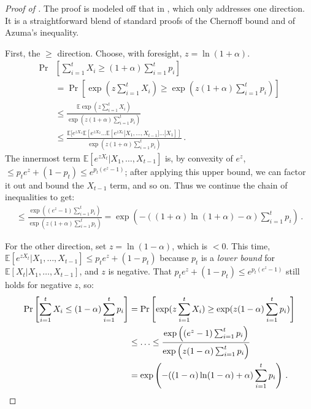 \documentclass[10pt,a4paper]{article}
\theoremstyle{definition}
\theoremstyle{remark}
\newcommand{\EE}{\mathbb{E}}
\begin{document}
\begin{itemize}
\begin{itemize}
\begin{proof}[Proof of ]
  The proof is modeled off that in \cite{Stoeckl23}, which only addresses
  one direction. It is a straightforward blend of standard proofs of the Chernoff bound and of Azuma's inequality.

  First, the $\ge$ direction. Choose, with foresight, $z = \ln(1 + \alpha)$.
  \begin{align*}
    \Pr&\left[ \sum_{i=1}^{t} X_i \ge (1 + \alpha) \sum_{i =1}^{t} p_i \right] \\
      &= \Pr\left[ \exp( z \sum_{i=1}^{t} X_i) \ge \exp(z (1 + \alpha) \sum_{i =1}^{t} p_i) \right] \\
      &\le \frac{\EE \exp( z \sum_{i=1}^{t} X_i)}{\exp(z (1 + \alpha) \sum_{i =1}^{t} p_i)} \\
      &\le \frac{\EE[e^{z X_1} \EE[e^{z X_2} \ldots \EE[e^{z X_t} | X_1,\ldots,X_{t-1}] \ldots | X_1] ]}{\exp(z (1 + \alpha) \sum_{i =1}^{t} p_i)} \,.
  \end{align*}
  The innermost term $\EE[e^{z X_t} | X_1,\ldots,X_{t-1}]$ is, by convexity of $e^z$, $\le p_t e^z + (1-p_t) \le e^{p_t (e^z - 1)}$; after applying this upper bound, we can factor it out and bound the $X_{t-1}$ term, and so on. Thus we continue the chain of inequalities to get:
  \begin{align*}
    \le \frac{\exp\left((e^z - 1)\sum_{i=1}^{t} p_i\right)}{\exp\left(z (1 + \alpha) \sum_{i =1}^{t} p_i\right)} = \exp\left(- ((1+\alpha) \ln (1+\alpha) - \alpha) \sum_{i =1}^{t} p_i\right) \,.
  \end{align*}
  
  For the other direction, set $z = \ln(1-\alpha)$, which is $< 0$.
  This time, $\EE[e^{z X_t} | X_1,\ldots,X_{t-1}] \le p_t e^z + (1-p_t)$ because $p_t$ is a \emph{lower bound} for $\EE[X_t | X_1,\ldots,X_{t-1}]$, and $z$ is negative. That $p_t e^z + (1-p_t) \le e^{p_t (e^z - 1)}$ still holds for negative $z$, so:
  \begin{align*}
    \Pr\left[ \sum_{i=1}^{t} X_i \le (1 - \alpha) \sum_{i =1}^{t} p_i \right] &= \Pr\left[ \exp(z\sum_{i=1}^{t} X_i) \ge \exp(z (1 - \alpha) \sum_{i =1}^{t} p_i) \right] \\
      &\le \ldots \le \frac{\exp\left((e^z - 1)\sum_{i=1}^{t} p_i\right)}{\exp\left(z (1 - \alpha) \sum_{i =1}^{t} p_i\right)} \\
      &= \exp\left(- ((1-\alpha) \ln (1-\alpha) + \alpha) \sum_{i =1}^{t} p_i\right) \,. \qedhere
  \end{align*}
\end{proof}


\end{itemize}
\end{itemize}
\end{document}
